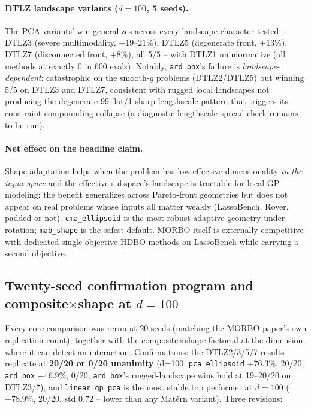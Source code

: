\documentclass[11pt]{article}
\begin{document}
\paragraph{DTLZ landscape variants ($d{=}100$, 5 seeds).} The PCA
variants' win generalizes across every landscape character tested --
DTLZ3 (severe multimodality, $+19$--$21\%$), DTLZ5 (degenerate front,
$+13\%$), DTLZ7 (disconnected front, $+8\%$), all 5/5 -- with DTLZ1
uninformative (all methods at exactly 0 in 600 evals). Notably,
\texttt{ard\_box}'s failure is \emph{landscape-dependent}: catastrophic on
the smooth-$g$ problems (DTLZ2/DTLZ5) but winning 5/5 on DTLZ3 and DTLZ7,
consistent with rugged local landscapes not producing the degenerate
99-flat/1-sharp lengthscale pattern that triggers its
constraint-compounding collapse (a diagnostic lengthscale-spread check
remains to be run).

\paragraph{Net effect on the headline claim.}
\label{sec:tr-shape-summary}
Shape adaptation helps when
the problem has low effective dimensionality \emph{in the input space}
and the effective subspace's landscape is tractable for local GP
modeling; the benefit generalizes across Pareto-front geometries but does
not appear on real problems whose inputs all matter weakly (LassoBench,
Rover, padded or not). \texttt{cma\_ellipsoid} is the most robust
adaptive geometry under rotation; \texttt{mab\_shape} is the safest
default. MORBO itself is externally competitive with dedicated
single-objective HDBO methods on LassoBench while carrying a second
objective.

\subsection{Twenty-seed confirmation program and composite$\times$shape at $d{=}100$}
\label{sec:twenty-seed}

Every core comparison was rerun at 20 seeds (matching the MORBO paper's
own replication count), together with the composite$\times$shape factorial
at the dimension where it can detect an interaction. Confirmations: the
DTLZ2/3/5/7 results replicate at \textbf{20/20 or 0/20 unanimity}
(d=100: \texttt{pca\_ellipsoid} $+76.3\%$, 20/20; \texttt{ard\_box}
$-46.9\%$, 0/20; \texttt{ard\_box}'s rugged-landscape wins hold at
19--20/20 on DTLZ3/7), and \texttt{linear\_gp\_pca} is the most stable top
performer at $d{=}100$ ($+78.9\%$, 20/20, std $0.72$ -- lower than any
Mat\'ern variant). Three revisions:
\end{document}
